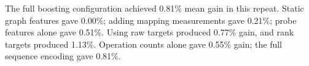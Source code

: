The full boosting configuration achieved 0.81\% mean gain in this repeat. Static graph features gave 0.00\%; adding mapping measurements gave 0.21\%; probe features alone gave 0.51\%. Using raw targets produced 0.77\% gain, and rank targets produced 1.13\%. Operation counts alone gave 0.55\% gain; the full sequence encoding gave 0.81\%.
